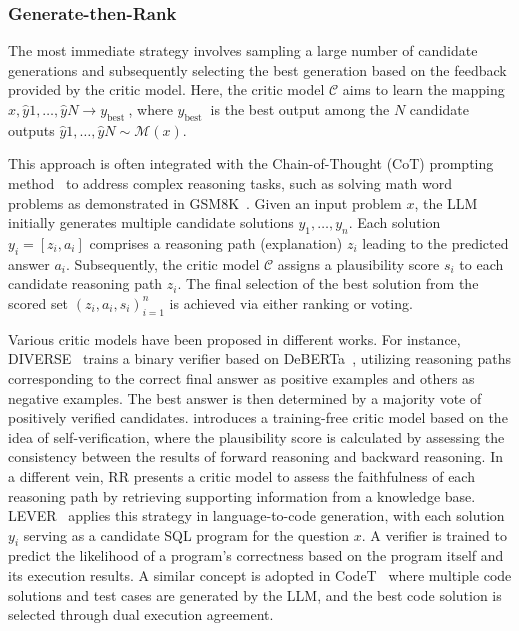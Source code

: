 \documentclass[12pt]{extarticle}
\begin{document}
\subsubsection{Generate-then-Rank}
The most immediate strategy involves sampling a large number of candidate generations and subsequently selecting the best generation based on the feedback provided by the critic model. Here, the critic model $\mathcal{C}$ aims to learn the mapping $x, \hat{y}{1}, \ldots, \hat{y}{N} \rightarrow y_{\text {best }}$, where $y_{\text {best }}$ is the best output among the $N$ candidate outputs $\hat{y}{1}, \ldots, \hat{y}{N} \sim \mathcal{M}(x)$.

This approach is often integrated with the Chain-of-Thought (CoT) prompting method~\cite{wei2023chainofthought} to address complex reasoning tasks, such as solving math word problems as demonstrated in GSM8K~\cite{cobbe2021training}. Given an input problem $x$, the LLM initially generates multiple candidate solutions $y_{1}, \ldots, y_{n}$. Each solution $y_{i}=\left[z_{i}, a_{i}\right]$ comprises a reasoning path (explanation) $z_{i}$ leading to the predicted answer $a_{i}$. Subsequently, the critic model $\mathcal{C}$ assigns a plausibility score $s_{i}$ to each candidate reasoning path $z_{i}$. The final selection of the best solution from the scored set $\left(z_{i}, a_{i}, s_{i}\right)_{i=1}^{n}$ is achieved via either ranking or voting.

Various critic models have been proposed in different works. For instance, DIVERSE~\cite{li-etal-2023-making} trains a binary verifier based on DeBERTa~\cite{he2021deberta}, utilizing reasoning paths corresponding to the correct final answer as positive examples and others as negative examples. The best answer is then determined by a majority vote of positively verified candidates.\cite{weng2023large} introduces a training-free critic model based on the idea of self-verification, where the plausibility score is calculated by assessing the consistency between the results of forward reasoning and backward reasoning. In a different vein, RR\cite{he2022rethinking} presents a critic model to assess the faithfulness of each reasoning path by retrieving supporting information from a knowledge base. LEVER~\cite{ni2023lever} applies this strategy in language-to-code generation, with each solution $y_{i}$ serving as a candidate SQL program for the question $x$. A verifier is trained to predict the likelihood of a program's correctness based on the program itself and its execution results. A similar concept is adopted in CodeT~\cite{chen2022codet} where multiple code solutions and test cases are generated by the LLM, and the best code solution is selected through dual execution agreement.
\end{document}

